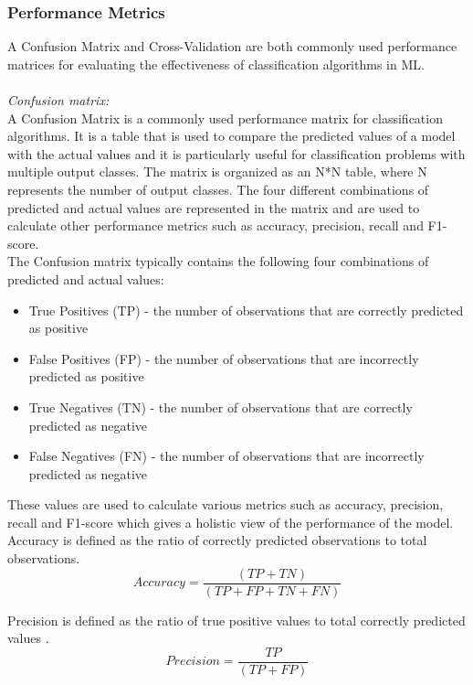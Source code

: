 \documentclass[conference]{IEEEtran}
\begin{document}
	\subsubsection{Performance Metrics}
	A Confusion Matrix and Cross-Validation are both commonly used performance matrices for evaluating the effectiveness of classification algorithms in ML.\\
	\\
	\textit{Confusion matrix:}\\
	A Confusion Matrix is a commonly used performance matrix for classification algorithms. It is a table that is used to compare the predicted values of a model with the actual values and it is particularly useful for classification problems with multiple output classes. The matrix is organized as an N*N table, where N represents the number of output classes. The four different combinations of predicted and actual values are represented in the matrix and are used to calculate other performance metrics such as accuracy, precision, recall and F1-score\cite{C34}.\\
	
	The Confusion matrix typically contains the following four combinations of predicted and actual values:
	\begin{itemize}
	\item True Positives (TP) - the number of observations that are correctly predicted as positive
	\item False Positives (FP) - the number of observations that are incorrectly predicted as positive
	\item True Negatives (TN) - the number of observations that are correctly predicted as negative
	\item False Negatives (FN) - the number of observations that are incorrectly predicted as negative
	\end{itemize}

	These values are used to calculate various metrics such as accuracy, precision, recall and F1-score which gives a holistic view of the performance of the model\cite{C35}.\\
	
	\noindent Accuracy is defined as the ratio of correctly predicted observations to total observations\cite{C35}.
	\begin{equation*}
		Accuracy = \frac{(TP + TN)} {(TP + FP +TN + FN)}
	\end{equation*}
	
	\noindent Precision is defined as the ratio of true positive values to total correctly predicted values \cite{C35}.
	\begin{equation*}
		Precision = \frac{TP}{(TP + FP)}
	\end{equation*}
	
\end{document}
